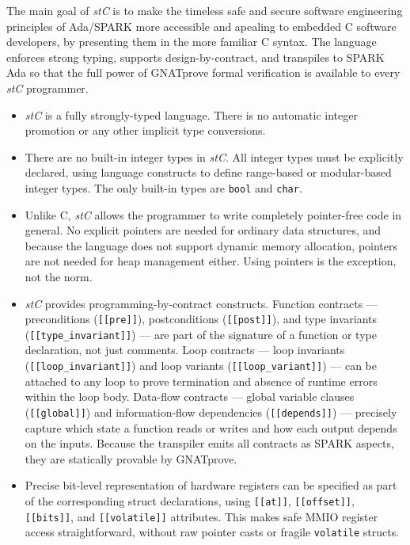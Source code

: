 \documentclass[11pt,letterpaper,twoside,openany]{book}
\begin{document}
The main goal of \emph{stC} is to make the timeless safe and secure software engineering principles of
Ada/SPARK more accessible and apealing to embedded C software developers, by presenting them in the more
familiar C syntax.
The language enforces strong typing, supports design-by-contract, and transpiles to SPARK Ada
so that the full power of GNATprove formal verification is available to every \emph{stC} programmer.

\begin{itemize}

\item \emph{stC} is a fully strongly-typed language. There is no automatic integer promotion
 or any other implicit type conversions.

\item There are no built-in integer types in \emph{stC}. All integer types must be explicitly declared,
using language constructs to define range-based or modular-based integer types. The only built-in
types are \verb'bool' and \verb'char'.

\item Unlike C, \emph{stC} allows the programmer to write completely pointer-free code in general.
      No explicit pointers are needed for ordinary data structures, and because the language does not
      support dynamic memory allocation, pointers are not needed for heap management either.
      Using pointers is the exception, not the norm.

\item \emph{stC} provides programming-by-contract constructs.
      Function contracts --- preconditions (\verb'[[pre]]'), postconditions (\verb'[[post]]'),
      and type invariants (\verb'[[type_invariant]]') --- are part of the signature of a function
      or type declaration, not just comments.
      Loop contracts --- loop invariants (\verb'[[loop_invariant]]') and loop variants
      (\verb'[[loop_variant]]') --- can be attached to any loop to prove termination and
      absence of runtime errors within the loop body.
      Data-flow contracts --- global variable clauses (\verb'[[global]]') and information-flow
      dependencies (\verb'[[depends]]') --- precisely capture which state a function reads or
      writes and how each output depends on the inputs.
      Because the transpiler emits all contracts as SPARK aspects, they are statically provable
      by GNATprove.

\item Precise bit-level representation of hardware registers can be specified as part of
      the corresponding struct declarations, using \verb'[[at]]', \verb'[[offset]]',
      \verb'[[bits]]', and \verb'[[volatile]]' attributes.
      This makes safe MMIO register access straightforward, without raw pointer casts or
      fragile \verb'volatile' structs.


\end{itemize}
\end{document}
